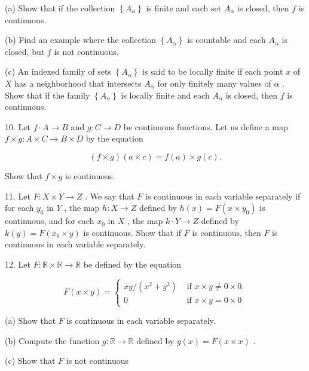 \documentclass[10pt]{article}
\begin{document}
(a) Show that if the collection \(\left\{  {A}_{\alpha }\right\}\) is finite and each set \({A}_{\alpha }\) is closed, then \(f\) is continuous.

(b) Find an example where the collection \(\left\{  {A}_{\alpha }\right\}\) is countable and each \({A}_{\alpha }\) is closed, but \(f\) is not continuous.

(c) An indexed family of sets \(\left\{  {A}_{\alpha }\right\}\) is said to be locally finite if each point \(x\) of \(X\) has a neighborhood that intersects \({A}_{\alpha }\) for only finitely many values of \(\alpha\) . Show that if the family \(\left\{  {A}_{\alpha }\right\}\) is locally finite and each \({A}_{\alpha }\) is closed, then \(f\) is continuous.

10. Let \(f \cdot  A \rightarrow  B\) and \(g : C \rightarrow  D\) be continuous functions. Let us define a map \(f \times  g : A \times  C \rightarrow  B \times  D\) by the equation

\[
\left( {f \times  g}\right) \left( {a \times  c}\right)  = f\left( a\right)  \times  g\left( c\right) .
\]

Show that \(f \times  g\) is continuous.

11. Let \(F : X \times  Y \rightarrow  Z\) . We say that \(F\) is continuous in each variable separately if for each \({y}_{0}\) in \(Y\) , the map \(h : X \rightarrow  Z\) defined by \(h\left( x\right)  = F\left( {x \times  {y}_{0}}\right)\) is continuous, and for each \({x}_{0}\) in \(X\) , the map \(k \cdot  Y \rightarrow  Z\) defined by \(k\left( y\right)  = F\left( {{x}_{0} \times  y}\right)\) is continuous. Show that if \(F\) is continuous, then \(F\) is continuous in each variable separately.

12. Let \(F : \mathbb{R} \times  \mathbb{R} \rightarrow  \mathbb{R}\) be defined by the equation

\[
F\left( {x \times  y}\right)  = \left\{  \begin{array}{ll} {xy}/\left( {{x}^{2} + {y}^{2}}\right) & \text{ if }x \times  y \neq  0 \times  0. \\  0 & \text{ if }x \times  y = 0 \times  0 \end{array}\right.
\]

(a) Show that \(F\) is continuous in each variable separately.

(b) Compute the function \(g : \mathbb{R} \rightarrow  \mathbb{R}\) defined by \(g\left( x\right)  = F\left( {x \times  x}\right)\) .

(c) Show that \(F\) is not continuous
\end{document}
